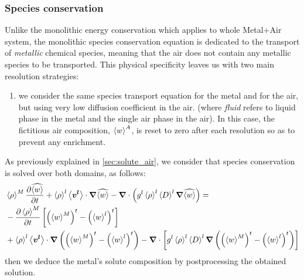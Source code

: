 \subsubsection{Species conservation}
Unlike the monolithic energy conservation which applies to whole Metal+Air system, the monolithic species conservation equation is dedicated
to the transport of \emph{metallic} chemical species, meaning that the air does not contain any metallic species to be transported.
This physical specificity leaves us with two main resolution strategies:
\begin{enumerate}
\itemsep0em
	\item we consider the same species transport equation for the metal and for the air, but using very low diffusion coefficient in the air.
			(where \emph{fluid } refers to liquid phase in the metal and the single air phase in the air). 
			In this case, the fictitious air composition, $\left \langle w \right \rangle^A$, 
			is reset to zero after each resolution so as to prevent any enrichment.
\end{enumerate}

As previously explained in \cref{sec:solute_air}, we consider that species conservation is solved over both domains, as follows:
\begin{align}
\label{eq:monolithic_solute}
\begin{split}
 & \avg{\rho}^M \tempup{\mix{\avg{w}}}  + \rhol  \vit \cdot \nabvec \mix{\avg{w}} - \nabvec \cdot \brac{\gl \rhol \Dl \nabvec \mix{\avg{w}}}=\\
 &	 - \tempup{\avg{\rho}^M} \crochet{\brac{\avg{w}^M}^t - \brac{\wl}^t} \\ 
 &	 + \rhol \vit \cdot \nabvec \brac{\brac{\avg{w}^M}^t -\brac{\wl}^t}
 	 - \nabvec \cdot \crochet{\gl \rhol \Dl  \nabvec \brac{\brac{\avg{w}^M}^t -\brac{\wl}^t} }
  \end{split}
\end{align}
then we deduce the metal's solute composition by postprocessing the obtained solution.


